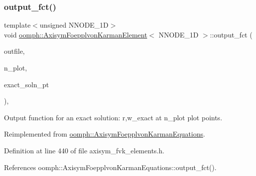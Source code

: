 \subsubsection{\texorpdfstring{output\+\_\+fct()}{output\_fct()}\hspace{0.1cm}{\footnotesize\ttfamily [1/4]}}
{\footnotesize\ttfamily template$<$unsigned N\+N\+O\+D\+E\+\_\+1D$>$ \\
void \hyperlink{classoomph_1_1AxisymFoepplvonKarmanElement}{oomph\+::\+Axisym\+Foepplvon\+Karman\+Element}$<$ N\+N\+O\+D\+E\+\_\+1D $>$\+::output\+\_\+fct (\begin{DoxyParamCaption}\item[{std\+::ostream \&}]{outfile,  }\item[{const unsigned \&}]{n\+\_\+plot,  }\item[{\hyperlink{classoomph_1_1FiniteElement_a690fd33af26cc3e84f39bba6d5a85202}{Finite\+Element\+::\+Steady\+Exact\+Solution\+Fct\+Pt}}]{exact\+\_\+soln\+\_\+pt }\end{DoxyParamCaption})\hspace{0.3cm}{\ttfamily [inline]}, {\ttfamily [virtual]}}



Output function for an exact solution\+: r,w\+\_\+exact at n\+\_\+plot plot points. 



Reimplemented from \hyperlink{classoomph_1_1AxisymFoepplvonKarmanEquations_aae7ed0c9ae0e1a1e2656534807a24527}{oomph\+::\+Axisym\+Foepplvon\+Karman\+Equations}.



Definition at line 440 of file axisym\+\_\+fvk\+\_\+elements.\+h.



References oomph\+::\+Axisym\+Foepplvon\+Karman\+Equations\+::output\+\_\+fct().

\mbox{\label{classoomph_1_1AxisymFoepplvonKarmanElement_a290c4391d1da3688805466cf2852a93e}} 
